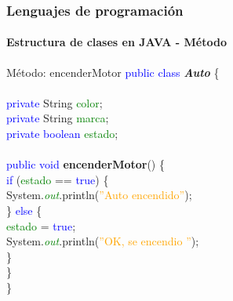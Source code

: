 \documentclass{beamer}
\begin{document}
		\begin{frame}
			\frametitle{Lenguajes de programaci\'on}
			\framesubtitle{Estructura de clases en JAVA - M\'etodo}

			\begin{block}{M\'etodo: encenderMotor}
				{\scriptsize
				\textcolor{blue}{public class} \textbf{\emph{Auto}} \{ \\
				\hspace{1cm} \\
				\hspace{1cm} \textcolor{blue}{private} String \textcolor{green}{color}; \ \\
				\hspace{1cm} \textcolor{blue}{private} String \textcolor{green}{marca}; \ \\
				\hspace{1cm} \textcolor{blue}{private} \textcolor{blue}{boolean} \textcolor{green}{estado}; \ \\
				\hspace{1cm} \\
				\hspace{1cm} \textcolor{blue}{public void} \textbf{encenderMotor}() \{ \\
				\hspace{2cm} \textcolor{blue}{if} (\textcolor{green}{estado} == \textcolor{blue}{true}) \{ \\
            		\hspace{3cm} System.\emph{\textcolor{green}{out}}.println(\textcolor{orange}{''Auto encendido''}); \\
        			\hspace{2cm} \} \textcolor{blue}{else} \{ \\
        			\hspace{3cm} \textcolor{green}{estado} = \textcolor{blue}{true}; \\
        			\hspace{3cm} System.\emph{\textcolor{green}{out}}.println(\textcolor{orange}{''OK, se encendio ''}); \\
        			\hspace{2cm} \} \\
				\hspace{1cm} \} \\
				\}}
			\end{block}
			
		\end{frame}
\end{document}
